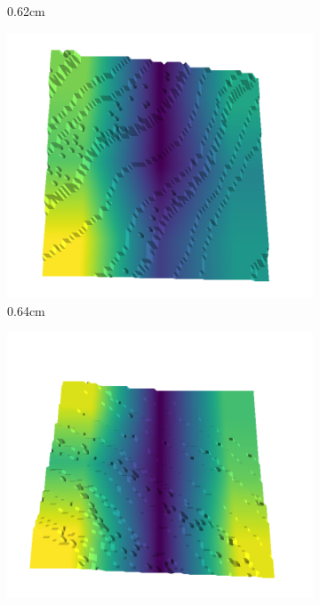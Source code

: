 \begin{figure}[H]
\begin{subfigure}[b]{0.192\linewidth}
    \caption{0.62cm}
    \label{fig : quarry-best-14}
    \end{subfigure}
    \begin{subfigure}[b]{0.192\linewidth}
    \includegraphics[width=\linewidth]{../img/5/quarry/best/63-patch-3d-majavi-colormap-150.png}
    \caption{0.64cm}
    \label{fig : quarry-best-15}
    \end{subfigure}
    \begin{subfigure}[b]{0.192\linewidth}
    \includegraphics[width=\linewidth]{../img/5/quarry/best/65-patch-3d-majavi-colormap-160.png}

\end{subfigure}
\end{figure}
